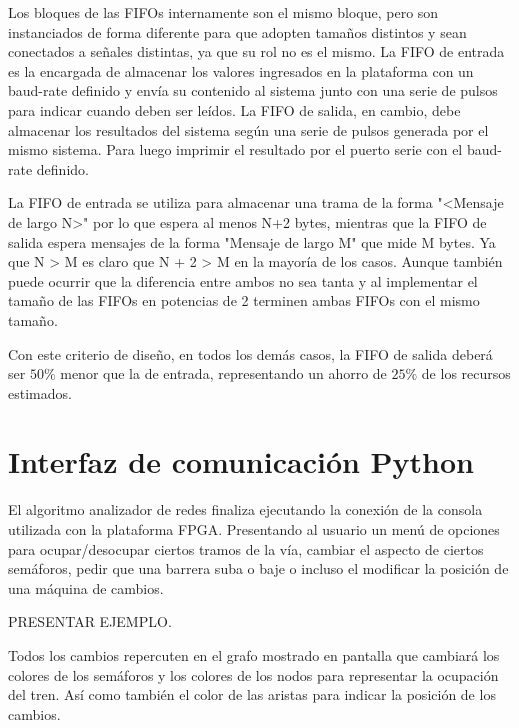 		Los bloques de las FIFOs internamente son el mismo bloque, pero son instanciados de forma diferente para que adopten tamaños distintos y sean conectados a señales distintas, ya que su rol no es el mismo. La FIFO de entrada es la encargada de almacenar los valores ingresados en la plataforma con un baud-rate definido y envía su contenido al sistema junto con una serie de pulsos para indicar cuando deben ser leídos. La FIFO de salida, en cambio, debe almacenar los resultados del sistema según una serie de pulsos generada por el mismo sistema. Para luego imprimir el resultado por el puerto serie con el baud-rate definido.

		La FIFO de entrada se utiliza para almacenar una trama de la forma "<Mensaje de largo N>" por lo que espera al menos N+2 bytes, mientras que la FIFO de salida espera mensajes de la forma "Mensaje de largo M" que mide M bytes. Ya que N > M es claro que N + 2 > M en la mayoría de los casos. Aunque también puede ocurrir que la diferencia entre ambos no sea tanta y al implementar el tamaño de las FIFOs en potencias de 2 terminen ambas FIFOs con el mismo tamaño. 

		Con este criterio de diseño, en todos los demás casos, la FIFO de salida deberá ser $50\%$ menor que la de entrada, representando un ahorro de $25\%$ de los recursos estimados.
		
\section{Interfaz de comunicación Python}

	El algoritmo analizador de redes finaliza ejecutando la conexión de la consola utilizada con la plataforma FPGA. Presentando al usuario un menú de opciones para ocupar/desocupar ciertos tramos de la vía, cambiar el aspecto de ciertos semáforos, pedir que una barrera suba o baje o incluso el modificar la posición de una máquina de cambios.
	
	PRESENTAR EJEMPLO.
	
	Todos los cambios repercuten en el grafo mostrado en pantalla que cambiará los colores de los semáforos y los colores de los nodos para representar la ocupación del tren. Así como también el color de las aristas para indicar la posición de los cambios.
